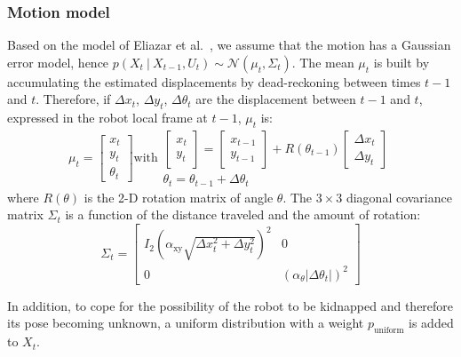 \documentclass[letterpaper, 10pt, conference]{ieeeconf}
\begin{document}
\subsubsection{Motion model}

Based on the model of Eliazar et al.~\cite{eliazar2004motionmodel}, we assume that the motion has a Gaussian error model, hence $p(X_t~|~X_{t-1}, U_{t})\sim\mathcal{N}(\mu_t,\Sigma_t)$.
The mean $\mu_t$ is built by accumulating the estimated displacements by dead-reckoning between times $t-1$ and $t$.
Therefore, if $\Delta x_t$, $\Delta y_t$, $\Delta \theta_t$ are the displacement between $t-1$ and $t$, expressed in the robot local frame at $t-1$, $\mu_t$ is:
\begin{equation}
\mu_t =
\left[ \begin{array}{c} x_t \\ y_t \\ \theta_t \end{array} \right]
\text{with}
\begin{array}{c}
\left[ \begin{array}{c} x_t \\ y_t \end{array} \right] =
\left[ \begin{array}{c} x_{t-1} \\ y_{t-1} \end{array} \right] +
R(\theta_{t-1})
\left[ \begin{array}{c} \Delta x_{t} \\ \Delta y_{t} \end{array} \right]
\\
\theta_t = \theta_{t-1} + \Delta \theta_t
\end{array}
\end{equation}
where $R(\theta)$ is the 2-D rotation matrix of angle $\theta$.
The $3\times3$ diagonal covariance matrix $\Sigma_t$ is a function of the distance traveled and the amount of rotation:
\begin{equation}
\Sigma_t=\begin{bmatrix} I_2 ( \alpha_\mathrm{xy} \sqrt{\Delta x_{t}^2 + \Delta y_{t}^2})^2  & 0 \\ 0 & (\alpha_\theta | \Delta \theta_t |)^2 \end{bmatrix}
\end{equation}

In addition, to cope for the possibility of the robot to be kidnapped and therefore its pose becoming unknown, a uniform distribution with a weight $p_\mathrm{uniform}$ is added to $X_t$.
\end{document}
